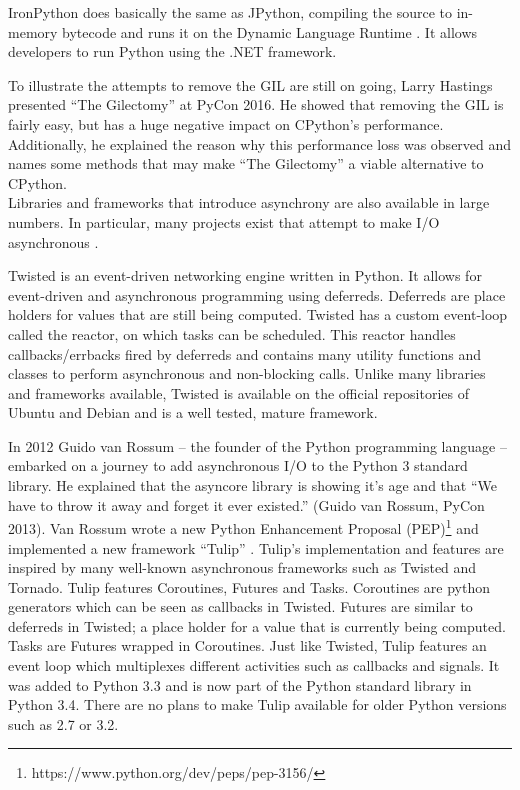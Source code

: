 IronPython does basically the same as JPython, compiling the source to in-memory bytecode and runs it on the Dynamic Language Runtime \cite{ironpython2014}.
It allows developers to run Python using the .NET framework.

To illustrate the attempts to remove the GIL are still on going, Larry Hastings presented ``The Gilectomy'' at PyCon 2016.
He showed that removing the GIL is fairly easy, but has a huge negative impact on CPython's performance.
Additionally, he explained the reason why this performance loss was observed and names some methods that may make ``The Gilectomy'' a viable alternative to CPython.\\

Libraries and frameworks that introduce asynchrony are also available in large numbers.
In particular, many projects exist that attempt to make I/O asynchronous \cite{asyncio2016python}.

Twisted is an event-driven networking engine written in Python.
It allows for event-driven and asynchronous programming using deferreds.
Deferreds are place holders for values that are still being computed.
Twisted has a custom event-loop called the reactor, on which tasks can be scheduled.
This reactor handles callbacks/errbacks fired by deferreds and contains many utility functions and classes to perform asynchronous and non-blocking calls.
Unlike many libraries and frameworks available, Twisted is available on the official repositories of Ubuntu and Debian and is a well tested, mature framework.

In 2012 Guido van Rossum -- the founder of the Python programming language -- embarked on a journey to add asynchronous I/O to the Python 3 standard library.
He explained that the asyncore library is showing it's age and that \enquote{We have to throw it away and forget it ever existed.} (Guido van Rossum, PyCon 2013).
Van Rossum wrote a new Python Enhancement Proposal (PEP)\footnote{https://www.python.org/dev/peps/pep-3156/} and implemented a new framework \enquote{Tulip} \cite{edge2013pycon}.
Tulip's implementation and features are inspired by many well-known asynchronous frameworks such as Twisted and Tornado.
Tulip features Coroutines, Futures and Tasks.
Coroutines are python generators which can be seen as callbacks in Twisted.
Futures are similar to deferreds in Twisted; a place holder for a value that is currently being computed.
Tasks are Futures wrapped in Coroutines.
Just like Twisted, Tulip features an event loop which multiplexes different activities such as callbacks and signals. 
It was added to Python 3.3 and is now part of the Python standard library in Python 3.4.
There are no plans to make Tulip available for older Python versions such as 2.7 or 3.2.

